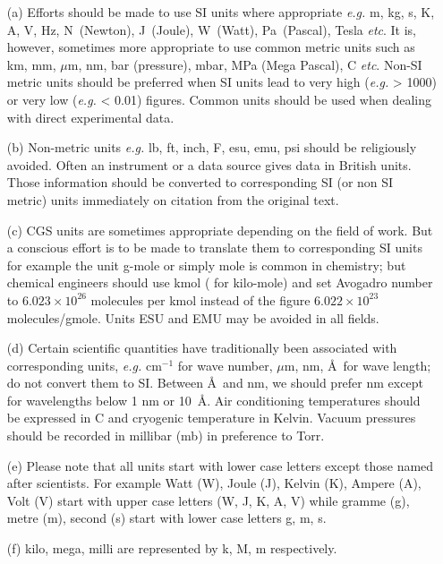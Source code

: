 \begin{itemize}
\item[(a)] Efforts should be made to use SI units where appropriate \textit{e.g.} m, kg, s, K, A, V, Hz, N~(Newton), J~(Joule), W~(Watt), Pa~(Pascal), Tesla \textit{etc}. It is, however, sometimes more appropriate to use common metric units such as km, mm, $\mu$m, nm, bar (pressure), mbar, MPa (Mega Pascal), \textdegree C \textit{etc}. Non-SI metric units should be preferred when SI units lead to very high (\textit{e.g.} > 1000) or very low (\textit{e.g.} < 0.01) figures. Common units should be used when dealing with direct experimental data.

\item[(b)] Non-metric units \textit{e.g.} lb, ft, inch, \textdegree F, esu, emu, psi should be religiously avoided. Often an instrument or a data source gives data in British units. Those information should be converted to corresponding SI (or non SI metric) units immediately on citation from the original text.
%
\item[(c)] CGS units are sometimes appropriate depending on the field of work. But a conscious effort is to be made to translate them to corresponding SI units for example the unit g-mole or simply mole is common in chemistry; but chemical engineers should use kmol ( for kilo-mole) and set Avogadro number to $6.023\times 10^{26}$ molecules per kmol instead of the figure $6.022\times 10^{23}$ molecules/gmole. Units ESU and EMU may be avoided in all fields.

\item[(d)] Certain scientific quantities have traditionally been associated with corresponding units, \textit{e.g.} cm$^{-1}$ for wave number, $\mu$m, nm, \AA~for wave length; do not convert them to SI. Between \AA~and nm, we should prefer nm except for wavelengths below 1 nm or 10~\AA. Air conditioning temperatures should be expressed in \textdegree C and cryogenic temperature in Kelvin. Vacuum pressures should be recorded in millibar (mb) in preference to Torr.

\item[(e)] Please note that all units start with lower case letters except those named after scientists. For example Watt (W), Joule (J), Kelvin (K), Ampere (A), Volt (V) start with upper case letters (W, J, K, A, V) while gramme (g), metre (m), second (s) start with lower case letters g, m, s.

\item[(f)] kilo, mega, milli are represented by k, M, m respectively.
\end{itemize}
